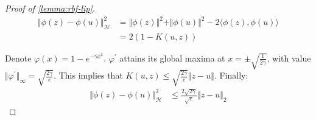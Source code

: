 \begin{proof}[Proof of \cref{lemma:rbf-lip}]

\begin{align}
\Vert \phi(z) - \phi(u)\Vert_\mathcal H^2 &= \Vert \phi(z) \Vert^2+ \Vert \phi(u)\Vert^2 - 2 \langle \phi(z), \phi(u)\rangle\\
&= 2 \left(1 - K(u, z)\right)
\end{align}

Denote $\varphi(x) = 1- e^{-\gamma x^2}$. $\varphi^\prime$ attains its global maxima at $x = \pm \sqrt{\frac{1}{2\gamma}}$, with value $\Vert \varphi^\prime\Vert_{\infty} = \sqrt{\frac{2\gamma}{e}}$. This implies that $K(u, z) \leq \sqrt{\frac{2 \gamma}{e}} \Vert z - u\Vert$. Finally:
\begin{align}
\Vert \phi(z) - \phi(u)\Vert_\mathcal H^2 & \leq \frac{2\sqrt{2\gamma}}{\sqrt{e}}\Vert z - u \Vert_2
\end{align}
\end{proof}

